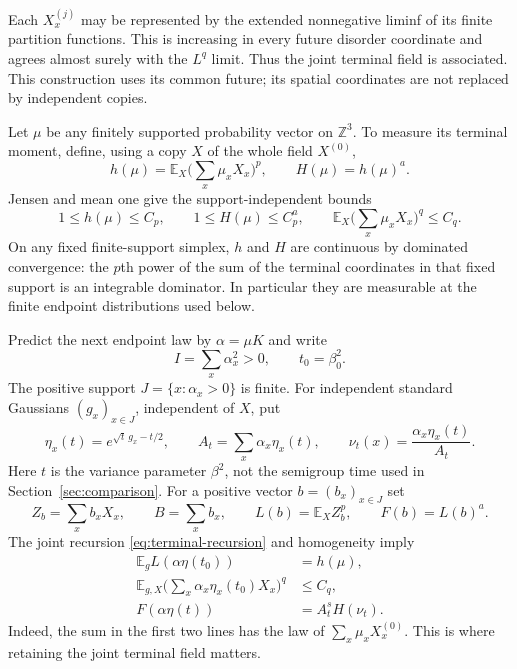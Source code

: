 \documentclass[11pt]{amsart}
\newcommand{\E}{\mathbb E}
\newcommand{\Z}{\mathbb Z}
\theoremstyle{remark}
\numberwithin{equation}{section}
\begin{document}
Each $X_x^{(j)}$ may be represented by the extended nonnegative liminf of its
finite partition functions. This is increasing in every future disorder
coordinate and agrees almost surely with the $L^q$ limit. Thus the joint
terminal field is associated. This construction uses its common future;
its spatial coordinates are not replaced by independent copies.

Let $\mu$ be any finitely supported probability vector on $\Z^3$. To measure
its terminal moment, define, using a copy $X$ of the whole field $X^{(0)}$,
\begin{equation}\label{eq:h-H}
 h(\mu)=\E_X\Big(\sum_x\mu_xX_x\Big)^p,
 \qquad H(\mu)=h(\mu)^a.
\end{equation}
Jensen and mean one give the support-independent bounds
\begin{equation}\label{eq:terminal-bounds}
 1\le h(\mu)\le C_p,\qquad 1\le H(\mu)\le C_p^a,
 \qquad \E_X\Big(\sum_x\mu_xX_x\Big)^q\le C_q.
\end{equation}
On any fixed finite-support simplex, $h$ and $H$ are continuous by dominated
convergence: the $p$th power of the sum of the terminal coordinates in that
fixed support is an integrable dominator.
In particular they are measurable at the finite endpoint distributions used
below.

Predict the next endpoint law by $\alpha=\mu K$ and write
\begin{equation}\label{eq:overlap}
 I=\sum_x\alpha_x^2>0,\qquad t_0=\beta_0^2.
\end{equation}
The positive support $J=\{x:\alpha_x>0\}$ is finite. For independent standard
Gaussians $(g_x)_{x\in J}$, independent of $X$, put
\begin{equation}\label{eq:one-step}
 \eta_x(t)=e^{\sqrt t\,g_x-t/2},\qquad
 A_t=\sum_x\alpha_x\eta_x(t),\qquad
 \nu_t(x)=\frac{\alpha_x\eta_x(t)}{A_t}.
\end{equation}
Here $t$ is the variance parameter $\beta^2$, not the semigroup time used in
Section~\ref{sec:comparison}.
For a positive vector $b=(b_x)_{x\in J}$ set
\begin{equation}\label{eq:L-F}
 Z_b=\sum_xb_xX_x,\qquad B=\sum_xb_x,\qquad
 L(b)=\E_X Z_b^p,\qquad F(b)=L(b)^a.
\end{equation}
The joint recursion \eqref{eq:terminal-recursion} and homogeneity imply
\begin{align}
 \E_g L(\alpha\eta(t_0))&=h(\mu),\label{eq:harmonic}\\
 \E_{g,X}\Big(\sum_x\alpha_x\eta_x(t_0)X_x\Big)^q&\le C_q,\label{eq:q-harmonic}\\
 F(\alpha\eta(t))&=A_t^sH(\nu_t).\label{eq:homogeneity}
\end{align}
Indeed, the sum in the first two lines has the law of
$\sum_x\mu_xX_x^{(0)}$. This is where retaining the joint terminal field
matters.
\end{document}
